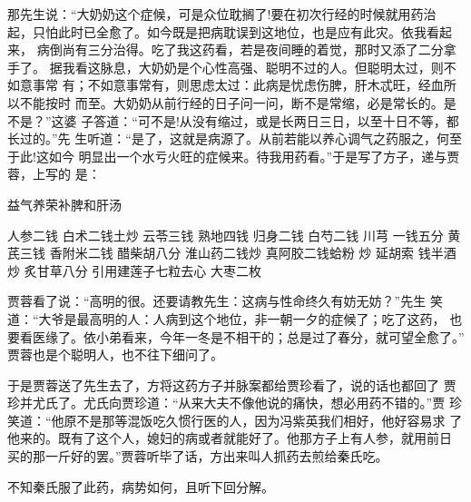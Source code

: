 那先生说：“大奶奶这个症候，可是众位耽搁了!要在初次行经的时候就用药治
起，只怕此时已全愈了。如今既是把病耽误到这地位，也是应有此灾。依我看起来，
病倒尚有三分治得。吃了我这药看，若是夜间睡的着觉，那时又添了二分拿手了。
据我看这脉息，大奶奶是个心性高强、聪明不过的人。但聪明太过，则不如意事常
有；不如意事常有，则思虑太过：此病是忧虑伤脾，肝木忒旺，经血所以不能按时
而至。大奶奶从前行经的日子问一问，断不是常缩，必是常长的。是不是？”这婆
子答道：“可不是!从没有缩过，或是长两日三日，以至十日不等，都长过的。”先
生听道：“是了，这就是病源了。从前若能以养心调气之药服之，何至于此!这如今
明显出一个水亏火旺的症候来。待我用药看。”于是写了方子，递与贾蓉，上写的
是：

益气养荣补脾和肝汤

人参二钱
白术二钱土炒
云苓三钱
熟地四钱
归身二钱
白芍二钱
川芎
一钱五分
黄芪三钱
香附米二钱
醋柴胡八分
淮山药二钱炒
真阿胶二钱蛤粉
炒
延胡索
钱半酒炒
炙甘草八分
引用建莲子七粒去心
大枣二枚

贾蓉看了说：“高明的很。还要请教先生：这病与性命终久有妨无妨？”先生
笑道：“大爷是最高明的人：人病到这个地位，非一朝一夕的症候了；吃了这药，
也要看医缘了。依小弟看来，今年一冬是不相干的；总是过了春分，就可望全愈了。”
贾蓉也是个聪明人，也不往下细问了。

于是贾蓉送了先生去了，方将这药方子并脉案都给贾珍看了，说的话也都回了
贾珍并尤氏了。尤氏向贾珍道：“从来大夫不像他说的痛快，想必用药不错的。”贾
珍笑道：“他原不是那等混饭吃久惯行医的人，因为冯紫英我们相好，他好容易求
了他来的。既有了这个人，媳妇的病或者就能好了。他那方子上有人参，就用前日
买的那一斤好的罢。”贾蓉听毕了话，方出来叫人抓药去煎给秦氏吃。

不知秦氏服了此药，病势如何，且听下回分解。